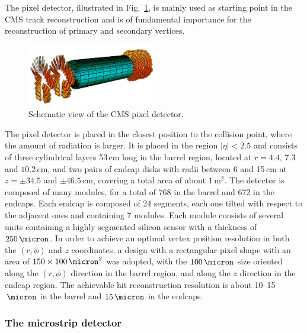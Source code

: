 The pixel detector, illustrated in Fig.~\ref{fig:pixel}, is mainly used as starting point in the CMS track reconstruction and is of fundamental importance for the reconstruction of primary and secondary vertices. 
\begin{figure}[htb]
\centering
\includegraphics[width=0.5\textwidth]{images/pixel.png}
\caption{Schematic view of the CMS pixel detector.}\label{fig:pixel}
\end{figure}
The pixel detector is placed in the closest position to the collision point, where the amount of radiation is larger. It is placed in the region $|\eta|<2.5$ and consists of three cylindrical layers 53\,cm long in the barrel region, located at $r=4.4$, $7.3$ and $10.2$\,cm, and two pairs of endcap disks with radii between 6 and 15\,cm at $z=\pm34.5$ and $\pm46.5$\,cm, covering a total area of about $1\,\mathrm{m^2}$. The detector is composed of many modules, for a total of 768 in the barrel and 672 in the endcaps. Each endcap is composed of 24 segments, each one tilted with respect to the adjacent ones and containing 7 modules. Each module consists of several units containing a highly segmented silicon sensor with a thickness of $250\,\micron$. In order to achieve an optimal vertex position resolution in both the $(r,\phi)$ and $z$ coordinates, a design with a rectangular pixel shape with an area of $150\times100\,\micron^2$ was adopted, with the $100\,\micron$ size oriented along the $(r,\phi)$ direction in the barrel region, and along the $z$ direction in the endcap region. The achievable hit reconstruction resolution is about 10--15$\,\micron$ in the barrel and $15\,\micron$ in the endcaps.

\subsubsection{The microstrip detector}

